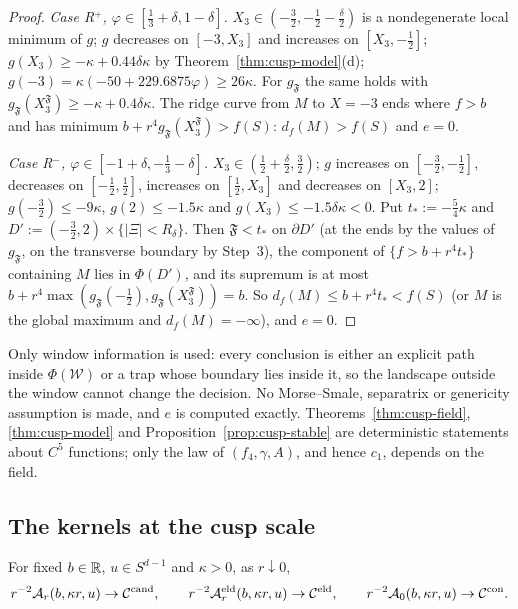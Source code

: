 \begin{proof}
\emph{Case R$^+$, $\varphi\in[\frac13+\delta,1-\delta]$.} $X_3\in(-\frac32,-\frac12-\frac\delta2)$ is a nondegenerate local minimum of $g$; $g$ decreases on $[-3,X_3]$ and increases on $[X_3,-\frac12]$; $g(X_3)\ge-\kappa+0.44\delta\kappa$ by Theorem~\ref{thm:cusp-model}(d); $g(-3)=\kappa(-50+229.6875\varphi)\ge26\kappa$. For $g_{\mathfrak F}$ the same holds with $g_{\mathfrak F}(X_3^{\mathfrak F})\ge-\kappa+0.4\delta\kappa$. The ridge curve from $M$ to $X=-3$ ends where $f>b$ and has minimum $b+r^4g_{\mathfrak F}(X_3^{\mathfrak F})>f(S)$: $d_f(M)>f(S)$ and $e=0$.

\emph{Case R$^-$, $\varphi\in[-1+\delta,-\frac13-\delta]$.} $X_3\in(\frac12+\frac\delta2,\frac32)$; $g$ increases on $[-\frac32,-\frac12]$, decreases on $[-\frac12,\frac12]$, increases on $[\frac12,X_3]$ and decreases on $[X_3,2]$; $g(-\frac32)\le-9\kappa$, $g(2)\le-1.5\kappa$ and $g(X_3)\le-1.5\delta\kappa<0$. Put $t_*:=-\frac54\kappa$ and $D':=(-\frac32,2)\times\{|\Xi|<R_\delta\}$. Then $\mathfrak F<t_*$ on $\partial D'$ (at the ends by the values of $g_{\mathfrak F}$, on the transverse boundary by Step~3), the component of $\{f>b+r^4t_*\}$ containing $M$ lies in $\Phi(D')$, and its supremum is at most $b+r^4\max(g_{\mathfrak F}(-\frac12),g_{\mathfrak F}(X_3^{\mathfrak F}))=b$. So $d_f(M)\le b+r^4t_*<f(S)$ (or $M$ is the global maximum and $d_f(M)=-\infty$), and $e=0$.
\end{proof}

Only window information is used: every conclusion is either an explicit path inside $\Phi(\mathcal W)$ or a trap whose boundary lies inside it, so the landscape outside the window cannot change the decision. No Morse--Smale, separatrix or genericity assumption is made, and $e$ is computed exactly. Theorems~\ref{thm:cusp-field}, \ref{thm:cusp-model} and Proposition~\ref{prop:cusp-stable} are deterministic statements about $C^5$ functions; only the law of $(f_4,\gamma,A)$, and hence $c_1$, depends on the field.

\subsection{The kernels at the cusp scale}\label{ssec:cusp-kernels}

\begin{theorem}\label{thm:cusp-kernels}
For fixed $b\in\mathbb R$, $u\in S^{d-1}$ and $\kappa>0$, as $r\downarrow0$,
\begin{equation}\label{eq:cusp-kernellim}
r^{-2}\mathcal A_r(b,\kappa r,u)\to\mathcal C^{\mathrm{cand}},\qquad r^{-2}\mathcal A^{\mathrm{eld}}_r(b,\kappa r,u)\to\mathcal C^{\mathrm{eld}},\qquad r^{-2}\mathcal A_0(b,\kappa r,u)\to\mathcal C^{\mathrm{con}}.
\end{equation}
\end{theorem}

